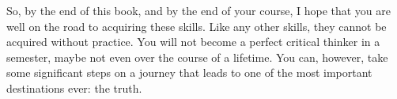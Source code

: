 So, by the end of this book, and by the end of your course, I hope that
you are well on the road to acquiring these skills. Like any other
skills, they cannot be acquired without practice. You will not become a
perfect critical thinker in a semester, maybe not even over the course
of a lifetime. You can, however, take some significant steps on a
journey that leads to one of the most important destinations ever: the
truth.

